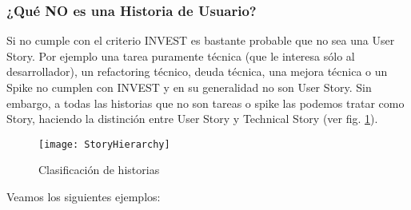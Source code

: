 \subsubsection{¿Qué NO es una Historia de Usuario?}

Si no cumple con el criterio INVEST es bastante probable que no sea una User Story. Por ejemplo una tarea puramente técnica (que le interesa sólo al desarrollador), un refactoring técnico, deuda técnica, una mejora técnica o un Spike no cumplen con INVEST y en su generalidad no son User Story. Sin embargo, a todas las historias que no son tareas o spike las podemos tratar como Story, haciendo la distinción entre User Story y Technical Story (ver fig. \ref{fig:StoryHierarchy}).

\begin{figure}[h]
  \centering
  \texttt{[image: StoryHierarchy]}
  \caption{Clasificación de historias}
  \centering
  \label{fig:StoryHierarchy} %
\end{figure}

Veamos los siguientes ejemplos:

